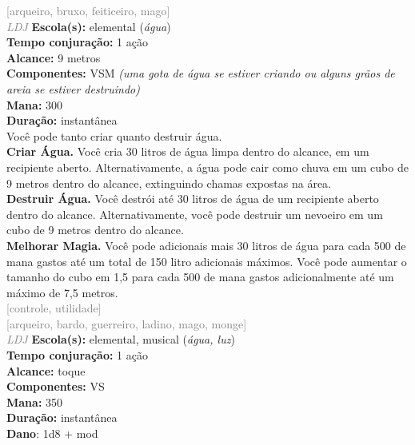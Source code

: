 \documentclass{RPG_Adventure}[2021/10/20]
\begin{document}
{\scriptsize \textcolor{gray}{[arqueiro, bruxo, feiticeiro, mago]\\}}
{\tiny \textcolor{gray}{\textit{LDJ}}}
{\small \t \textbf{Escola(s):} elemental (\textit{água})\\\t \textbf{Tempo conjuração:} 1 ação\\\t \textbf{Alcance:} 9 metros\\\t \textbf{Componentes:} VSM \textit{(uma gota de água se estiver criando ou alguns grãos de areia se estiver destruindo)}\\\t \textbf{Mana:} 300\\\t \textbf{Duração:} instantânea\\}
{\normalsize Você pode tanto criar quanto destruir água.\\\t \textbf{Criar Água.} Você cria 30 litros de água limpa dentro do alcance, em um recipiente aberto. Alternativamente, a água pode cair como chuva em um cubo de 9 metros dentro do alcance, extinguindo chamas expostas na área.\\\t \textbf{Destruir Água.} Você destrói até 30 litros de água de um recipiente aberto dentro do alcance. Alternativamente, você pode destruir um nevoeiro em um cubo de 9 metros dentro do alcance.\\\t \textbf{Melhorar Magia.} Você pode adicionais mais 30 litros de água para cada 500 de mana gastos até um total de 150 litro adicionais máximos. Você pode aumentar o tamanho do cubo em 1,5 para cada 500 de mana gastos adicionalmente até um máximo de 7,5 metros.\\}
{\scriptsize \textcolor{gray}{[controle, utilidade]\\}}
{\scriptsize \textcolor{gray}{[arqueiro, bardo, guerreiro, ladino, mago, monge]\\}}
{\tiny \textcolor{gray}{\textit{LDJ}}}
{\small \t \textbf{Escola(s):} elemental, musical (\textit{água, luz})\\\t \textbf{Tempo conjuração:} 1 ação\\\t \textbf{Alcance:} toque\\\t \textbf{Componentes:} VS\\\t \textbf{Mana:} 350\\\t \textbf{Duração:} instantânea\\\t \textbf{Dano}: 1d8 + mod\\}
\end{document}
